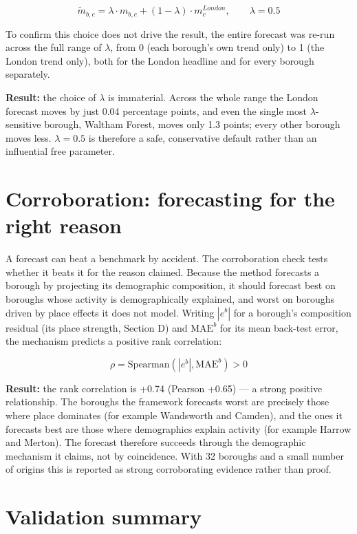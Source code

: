 \documentclass[ %
                    author={Ashrey Ashrey, Sanya Kapoor, Trisha Sharma, Yash Bhooshan Pandloskar},
                supervisor={Dr. Dalila O’Grady},
                    degree={MSc},
                     title={Using machine learning to forecast physical activity participation, volunteering and activity patterns in London},
                  subtitle={},
                      type={},
                      year={2021}]{dissertation}
\begin{document}
\[
\widetilde{m}_{b,c}
=
\lambda \cdot m_{b,c}
+
(1-\lambda)\cdot m_c^{London},
\qquad
\lambda=0.5
\]

To confirm this choice does not drive the result, the entire forecast was re-run across the full range of \(\lambda\), from 0 (each borough's own trend only) to 1 (the London trend only), both for the London headline and for every borough separately.

\noindent
\textbf{Result:} the choice of \(\lambda\) is immaterial. Across the whole range the London forecast moves by just 0.04 percentage points, and even the single most \(\lambda\)-sensitive borough, Waltham Forest, moves only 1.3 points; every other borough moves less. \(\lambda=0.5\) is therefore a safe, conservative default rather than an influential free parameter.

\section{Corroboration: forecasting for the right reason}

\noindent
A forecast can beat a benchmark by accident. The corroboration check tests whether it beats it for the reason claimed. Because the method forecasts a borough by projecting its demographic composition, it should forecast best on boroughs whose activity is demographically explained, and worst on boroughs driven by place effects it does not model. Writing \(|e^b|\) for a borough's composition residual (its place strength, Section D) and \(\mathrm{MAE}^b\) for its mean back-test error, the mechanism predicts a positive rank correlation:

\[
\rho
=
\mathrm{Spearman}
\left(
|e^b|,
\mathrm{MAE}^b
\right)
>
0
\]

\noindent
\textbf{Result:} the rank correlation is +0.74 (Pearson +0.65) --- a strong positive relationship. The boroughs the framework forecasts worst are precisely those where place dominates (for example Wandsworth and Camden), and the ones it forecasts best are those where demographics explain activity (for example Harrow and Merton). The forecast therefore succeeds through the demographic mechanism it claims, not by coincidence. With 32 boroughs and a small number of origins this is reported as strong corroborating evidence rather than proof.

\section{Validation summary}
\end{document}
